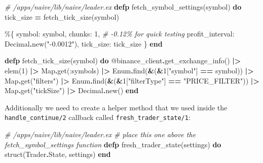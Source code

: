 \documentclass[
  oneside]{book}
\newenvironment{Shaded}{\begin{snugshade}}{\end{snugshade}}
\newcommand{\CommentTok}[1]{\textcolor[rgb]{0.56,0.35,0.01}{\textit{#1}}}
\newcommand{\ConstantTok}[1]{\textcolor[rgb]{0.00,0.00,0.00}{#1}}
\newcommand{\DecValTok}[1]{\textcolor[rgb]{0.00,0.00,0.81}{#1}}
\newcommand{\KeywordTok}[1]{\textcolor[rgb]{0.13,0.29,0.53}{\textbf{#1}}}
\newcommand{\NormalTok}[1]{#1}
\newcommand{\OperatorTok}[1]{\textcolor[rgb]{0.81,0.36,0.00}{\textbf{#1}}}
\newcommand{\OtherTok}[1]{\textcolor[rgb]{0.56,0.35,0.01}{#1}}
\newcommand{\StringTok}[1]{\textcolor[rgb]{0.31,0.60,0.02}{#1}}
\newcommand{\VariableTok}[1]{\textcolor[rgb]{0.00,0.00,0.00}{#1}}
\begin{document}
\begin{Shaded}
\begin{Highlighting}[]
  \CommentTok{\# /apps/naive/lib/naive/leader.ex}
  \KeywordTok{defp}\NormalTok{ fetch\_symbol\_settings(symbol) }\KeywordTok{do}
\NormalTok{    tick\_size }\OperatorTok{=}\NormalTok{ fetch\_tick\_size(symbol)}

\NormalTok{    \%\{}
      \VariableTok{symbol:}\NormalTok{ symbol,}
      \VariableTok{chunks:} \DecValTok{1}\NormalTok{,}
      \CommentTok{\# {-}0.12\% for quick testing}
      \VariableTok{profit\_interval:} \ConstantTok{Decimal}\OperatorTok{.}\NormalTok{new(}\StringTok{"{-}0.0012"}\NormalTok{),}
      \VariableTok{tick\_size:}\NormalTok{ tick\_size}
\NormalTok{    \}}
  \KeywordTok{end}

  \KeywordTok{defp}\NormalTok{ fetch\_tick\_size(symbol) }\KeywordTok{do}
    \OtherTok{@binance\_client}\OperatorTok{.}\NormalTok{get\_exchange\_info()}
    \OperatorTok{|\textgreater{}}\NormalTok{ elem(}\DecValTok{1}\NormalTok{)}
    \OperatorTok{|\textgreater{}} \ConstantTok{Map}\OperatorTok{.}\NormalTok{get(}\VariableTok{:symbols}\NormalTok{)}
    \OperatorTok{|\textgreater{}} \ConstantTok{Enum}\OperatorTok{.}\NormalTok{find(}\OperatorTok{\&}\NormalTok{(}\OperatorTok{\&}\DecValTok{1}\NormalTok{[}\StringTok{"symbol"}\NormalTok{] }\OperatorTok{==}\NormalTok{ symbol))}
    \OperatorTok{|\textgreater{}} \ConstantTok{Map}\OperatorTok{.}\NormalTok{get(}\StringTok{"filters"}\NormalTok{)}
    \OperatorTok{|\textgreater{}} \ConstantTok{Enum}\OperatorTok{.}\NormalTok{find(}\OperatorTok{\&}\NormalTok{(}\OperatorTok{\&}\DecValTok{1}\NormalTok{[}\StringTok{"filterType"}\NormalTok{] }\OperatorTok{==} \StringTok{"PRICE\_FILTER"}\NormalTok{))}
    \OperatorTok{|\textgreater{}} \ConstantTok{Map}\OperatorTok{.}\NormalTok{get(}\StringTok{"tickSize"}\NormalTok{)}
    \OperatorTok{|\textgreater{}} \ConstantTok{Decimal}\OperatorTok{.}\NormalTok{new()}
  \KeywordTok{end}
\end{Highlighting}
\end{Shaded}

Additionally we need to create a helper method that we used inside the \texttt{handle\_continue/2} callback called \texttt{fresh\_trader\_state/1}:

\begin{Shaded}
\begin{Highlighting}[]
  \CommentTok{\# /apps/naive/lib/naive/leader.ex}
  \CommentTok{\# place this one above the \textasciigrave{}fetch\_symbol\_settings\textasciigrave{} function}
  \KeywordTok{defp}\NormalTok{ fresh\_trader\_state(settings) }\KeywordTok{do}
\NormalTok{    struct(}\ConstantTok{Trader}\OperatorTok{.}\ConstantTok{State}\NormalTok{, settings)}
  \KeywordTok{end}
\end{Highlighting}
\end{Shaded}
\end{document}
